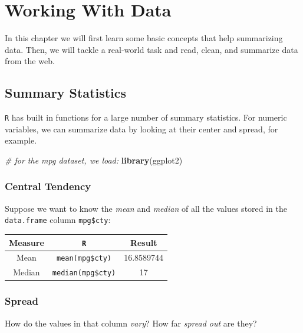 \documentclass[]{book}
\newenvironment{Shaded}{\begin{snugshade}}{\end{snugshade}}
\newcommand{\CommentTok}[1]{\textcolor[rgb]{0.56,0.35,0.01}{\textit{#1}}}
\newcommand{\KeywordTok}[1]{\textcolor[rgb]{0.13,0.29,0.53}{\textbf{#1}}}
\newcommand{\NormalTok}[1]{#1}
\begin{document}
\hypertarget{sum}{%
\chapter{Working With Data}\label{sum}}

In this chapter we will first learn some basic concepts that help summarizing data. Then, we will tackle a real-world task and read, clean, and summarize data from the web.

\hypertarget{summary-statistics}{%
\section{Summary Statistics}\label{summary-statistics}}

\texttt{R} has built in functions for a large number of summary statistics. For numeric variables, we can summarize data by looking at their center and spread, for example.

\begin{Shaded}
\begin{Highlighting}[]
\CommentTok{# for the mpg dataset, we load:}
\KeywordTok{library}\NormalTok{(ggplot2)}
\end{Highlighting}
\end{Shaded}

\hypertarget{central-tendency}{%
\subsection*{Central Tendency}\label{central-tendency}}

Suppose we want to know the \emph{mean} and \emph{median} of all the values stored in the \texttt{data.frame} column \texttt{mpg\$cty}:

\begin{longtable}[]{@{}ccc@{}}
\toprule
Measure & \texttt{R} & Result\tabularnewline
\midrule
\endhead
Mean & \texttt{mean(mpg\$cty)} & 16.8589744\tabularnewline
Median & \texttt{median(mpg\$cty)} & 17\tabularnewline
\bottomrule
\end{longtable}

\hypertarget{spread}{%
\subsection*{Spread}\label{spread}}

How do the values in that column \emph{vary}? How far \emph{spread out} are they?
\end{document}
